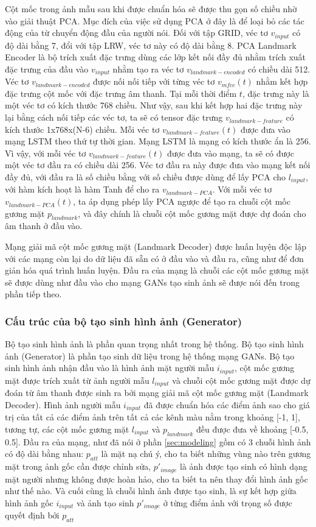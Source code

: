 Cột mốc trong ảnh mẫu sau khi được chuẩn hóa sẽ được thu gọn số chiều nhờ vào giải thuật PCA. Mục đích của việc sử dụng PCA ở đây là để loại bỏ các tác động của từ chuyển động đầu của người nói. Đối với tập GRID, véc tơ $v_{input}$ có độ dài bằng 7, đổi với tập LRW, véc tơ này có độ dài bằng 8. PCA Landmark Encoder là bộ trích xuất đặc trưng dùng các lớp kết nối đầy đủ nhằm trích xuất đặc trưng của đầu vào $v_{input}$ nhằm tạo ra véc tơ $v_{landmark-encoded}$ có chiều dài 512. Véc tơ $v_{landmark-encoded}$ được nối nối tiếp với từng véc tơ $v_{mfcc}(t)$ nhằm kết hợp đặc trưng cột mốc với đặc trưng âm thanh. Tại mỗi thời điểm $t$, đặc trưng này là một véc tơ có kích thước 768 chiều. Như vậy, sau khi kết hợp hai đặc trưng này lại bằng cách nối tiếp các véc tơ, ta sẽ có tensor đặc trưng $v_{landmark-feature}$ có kích thước 1x768x(N-6) chiều. Mỗi véc tơ $v_{landmark-feature}(t)$ được đưa vào mạng LSTM theo thứ tự thời gian. Mạng LSTM là mạng có kích thước ẩn là 256. Vì vậy, với mỗi véc tơ $v_{landmark-feature}(t)$ được đưa vào mạng, ta sẽ có được một véc tơ đầu ra có chiều dài 256. Véc tơ đầu ra này được đưa vào mạng kết nối đầy đủ, với đầu ra là số chiều bằng với số chiều được dùng để lấy PCA cho $l_{input}$, với hàm kích hoạt là hàm Tanh để cho ra $v_{landmark-PCA}$. Với mỗi véc tơ $v_{landmark-PCA}(t)$, ta áp dụng phép lấy PCA ngược để tạo ra chuỗi cột mốc gương mặt $p_{landmark}$, và đây chính là chuỗi cột mốc gương mặt được dự đoán cho âm thanh ở đầu vào.

Mạng giải mã cột mốc gương mặt (Landmark Decoder) được huấn luyện độc lập với các mạng còn lại do dữ liệu đã sẵn có ở đầu vào và đầu ra, cũng như để đơn giản hóa quá trình huấn luyện. Đầu ra của mạng là chuỗi các cột mốc gương mặt sẽ được dùng như đầu vào cho mạng GANs tạo sinh ảnh sẽ được nói đến trong phần tiếp theo.

\subsubsection{Cấu trúc của bộ tạo sinh hình ảnh (Generator)}

Bộ tạo sinh hình ảnh là phần quan trọng nhất trong hệ thống. Bộ tạo sinh hình ảnh (Generator) là phần tạo sinh dữ liệu trong hệ thống mạng GANs. Bộ tạo sinh hình ảnh nhận đầu vào là hình ảnh mặt người mẫu $i_{input}$, cột mốc gương mặt được trích xuất từ ảnh người mẫu $l_{input}$ và chuỗi cột mốc gương mặt được dự đoán từ âm thanh được sinh ra bởi mạng giải mã cột mốc gương mặt (Landmark Decoder). Hình ảnh người mẫu $i_{input}$ đã được chuẩn hóa các điểm ảnh sao cho giá trị của tất cả các điểm ảnh trên tất cả các kênh màu nằm trong khoảng [-1, 1], tương tự, các cột mốc gương mặt $l_{input}$ và $p_{landmark}$ đều được đưa về khoảng [-0.5, 0.5]. Đầu ra của mạng, như đã nói ở phần \ref{sec:modeling} gồm có 3 chuỗi hình ảnh có độ dài bằng nhau: $p_{att}$ là mặt nạ chú ý, cho ta biết những vùng nào trên gương mặt trong ảnh gốc cần được chỉnh sửa, $p'_{image}$ là ảnh được tạo sinh có hình dạng mặt người nhưng không được hoàn hảo, cho ta biết ta nên thay đổi hình ảnh gốc như thế nào. Và cuối cùng là chuỗi hình ảnh được tạo sinh, là sự kết hợp giữa hình ảnh gốc $i_{input}$ và ảnh tạo sinh $p'_{image}$ ở từng điểm ảnh với trọng số được quyết định bởi $p_{att}$ 

